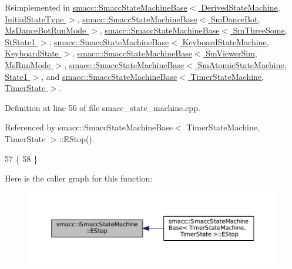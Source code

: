 Reimplemented in \hyperlink{structsmacc_1_1SmaccStateMachineBase_af1d145820c98089389e7de97a6744231}{smacc\+::\+Smacc\+State\+Machine\+Base$<$ Derived\+State\+Machine, Initial\+State\+Type $>$}, \hyperlink{structsmacc_1_1SmaccStateMachineBase_af1d145820c98089389e7de97a6744231}{smacc\+::\+Smacc\+State\+Machine\+Base$<$ Sm\+Dance\+Bot, Ms\+Dance\+Bot\+Run\+Mode $>$}, \hyperlink{structsmacc_1_1SmaccStateMachineBase_af1d145820c98089389e7de97a6744231}{smacc\+::\+Smacc\+State\+Machine\+Base$<$ Sm\+Three\+Some, St\+State1 $>$}, \hyperlink{structsmacc_1_1SmaccStateMachineBase_af1d145820c98089389e7de97a6744231}{smacc\+::\+Smacc\+State\+Machine\+Base$<$ Keyboard\+State\+Machine, Keyboard\+State $>$}, \hyperlink{structsmacc_1_1SmaccStateMachineBase_af1d145820c98089389e7de97a6744231}{smacc\+::\+Smacc\+State\+Machine\+Base$<$ Sm\+Viewer\+Sim, Ms\+Run\+Mode $>$}, \hyperlink{structsmacc_1_1SmaccStateMachineBase_af1d145820c98089389e7de97a6744231}{smacc\+::\+Smacc\+State\+Machine\+Base$<$ Sm\+Atomic\+State\+Machine, State1 $>$}, and \hyperlink{structsmacc_1_1SmaccStateMachineBase_af1d145820c98089389e7de97a6744231}{smacc\+::\+Smacc\+State\+Machine\+Base$<$ Timer\+State\+Machine, Timer\+State $>$}.



Definition at line 56 of file smacc\+\_\+state\+\_\+machine.\+cpp.



Referenced by smacc\+::\+Smacc\+State\+Machine\+Base$<$ Timer\+State\+Machine, Timer\+State $>$\+::\+E\+Stop().


\begin{DoxyCode}
57 \{
58 \}
\end{DoxyCode}


Here is the caller graph for this function\+:
\nopagebreak
\begin{figure}[H]
\begin{center}
\leavevmode
\includegraphics[width=350pt]{classsmacc_1_1ISmaccStateMachine_a3c5aab001d1bb7edcb37413404e4a7c2_icgraph}
\end{center}
\end{figure}


